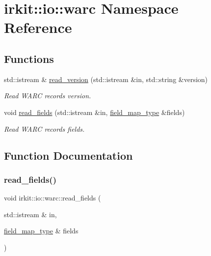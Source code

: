 \hypertarget{namespaceirkit_1_1io_1_1warc}{}\section{irkit\+:\+:io\+:\+:warc Namespace Reference}
\label{namespaceirkit_1_1io_1_1warc}
\subsection*{Functions}
\begin{DoxyCompactItemize}
\item 
std\+::istream \& \mbox{\hyperlink{namespaceirkit_1_1io_1_1warc_a09893fe6fcb5dc9474474aa904c510d2}{read\+\_\+version}} (std\+::istream \&in, std\+::string \&version)
\begin{DoxyCompactList}\small\item\em Read W\+A\+RC record\textquotesingle{}s version. \end{DoxyCompactList}\item 
void \mbox{\hyperlink{namespaceirkit_1_1io_1_1warc_aef4327721bee95960da11fd934327169}{read\+\_\+fields}} (std\+::istream \&in, \mbox{\hyperlink{namespaceirkit_1_1io_a3293145f3599deb5abb1ec2ed6d2c2ae}{field\+\_\+map\+\_\+type}} \&fields)
\begin{DoxyCompactList}\small\item\em Read W\+A\+RC record\textquotesingle{}s fields. \end{DoxyCompactList}\end{DoxyCompactItemize}


\subsection{Function Documentation}
\mbox{\label{namespaceirkit_1_1io_1_1warc_aef4327721bee95960da11fd934327169}} 
\subsubsection{\texorpdfstring{read\+\_\+fields()}{read\_fields()}}
{\footnotesize\ttfamily void irkit\+::io\+::warc\+::read\+\_\+fields (\begin{DoxyParamCaption}\item[{std\+::istream \&}]{in,  }\item[{\mbox{\hyperlink{namespaceirkit_1_1io_a3293145f3599deb5abb1ec2ed6d2c2ae}{field\+\_\+map\+\_\+type}} \&}]{fields }\end{DoxyParamCaption})\hspace{0.3cm}{\ttfamily [inline]}}



